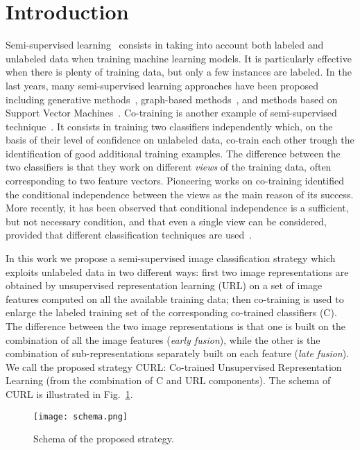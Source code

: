 \documentclass[journal,11pt]{IEEEtran}
\newcommand{\ADD}[1]{#1}
\newcommand{\coso}{strategy}
\begin{document}
\section{Introduction}
\label{sec:intro}

Semi-supervised learning~\cite{chapelle2006semi} consists in taking
into account both labeled and unlabeled data when training machine
learning models.  It is particularly effective when there is plenty of
training data, but only a few instances are labeled.  In the last
years, many semi-supervised learning approaches have been proposed
including generative methods~\cite{nigam2000text,fujino2005hybrid},
graph-based methods~\cite{blum2001learning,chapelle2002cluster}, and
methods based on Support Vector
Machines~\cite{joachims1999transductive,belkin2006manifold}.
Co-training is another example of semi-supervised
technique~\cite{blum1998combining}.  It consists in training two
classifiers independently which, on the basis of their level of
confidence on unlabeled data, co-train each other trough the
identification of good additional training examples.  The difference
between the two classifiers is that they work on different
\emph{views} of the training data, often corresponding to two feature
vectors.  Pioneering works on co-training identified the conditional
independence between the views as the main reason of its success.
More recently, it has been observed that conditional independence is a
sufficient, but not necessary condition, and that even a single view
can be considered, provided that different classification techniques
are used~\cite{zhou2010semi}.

In this work we propose a semi-supervised image classification
strategy which exploits unlabeled data in two different ways: first
two image representations are obtained by unsupervised representation learning \ADD{(URL)} on a
set of image features computed on all the available training data;
then co-training is used to enlarge the labeled training set of the
corresponding co-trained classifiers \ADD{(C)}.  The difference between the two image
representations is that one is built on the combination of all the
image features (\emph{early fusion}), while the other is the
combination of sub-representations separately built on each feature
(\emph{late fusion}).  \ADD{We call the proposed strategy CURL: Co-trained Unsupervised Representation Learning  (from the combination of C and URL components). The schema of CURL} is illustrated in
Fig.~\ref{fig:schema}.
\begin{figure}%
	\texttt{[image: schema.png]}%
  \caption{Schema of the proposed \coso.}%
  \label{fig:schema}%
\end{figure}
\end{document}
